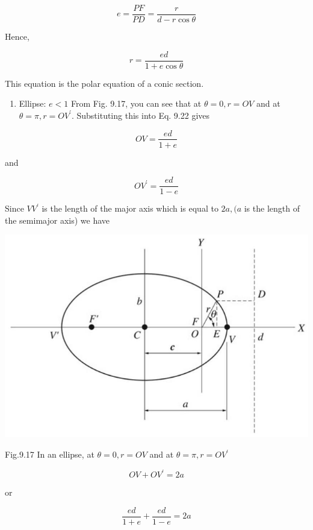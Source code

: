 \documentclass[10pt]{article}
\begin{document}
$$
e=\frac{P F}{P D}=\frac{r}{d-r \cos \theta}
$$

Hence,


\begin{equation*}
r=\frac{e d}{1+e \cos \theta} \tag{9.22}
\end{equation*}


This equation is the polar equation of a conic section.

\begin{enumerate}
  \item Ellipse: $e<1$ From Fig. 9.17, you can see that at $\theta=0, r=O V$ and at $\theta=\pi, r=O V^{\prime}$. Substituting this into Eq. 9.22 gives
\end{enumerate}

$$
O V=\frac{e d}{1+e}
$$

and

$$
O V^{\prime}=\frac{e d}{1-e}
$$

Since $V V^{\prime}$ is the length of the major axis which is equal to $2 a,(a$ is the length of the semimajor axis) we have

\begin{center}
\includegraphics[max width=\textwidth]{2024_09_13_db1f357d2aad0a03eb2eg-153(1)}
\end{center}

Fig.9.17 In an ellipse, at $\theta=0, r=O V$ and at $\theta=\pi, r=O V^{\prime}$


\begin{equation*}
O V+O V^{\prime}=2 a \tag{9.23}
\end{equation*}


or

$$
\frac{e d}{1+e}+\frac{e d}{1-e}=2 a
$$
\end{document}
